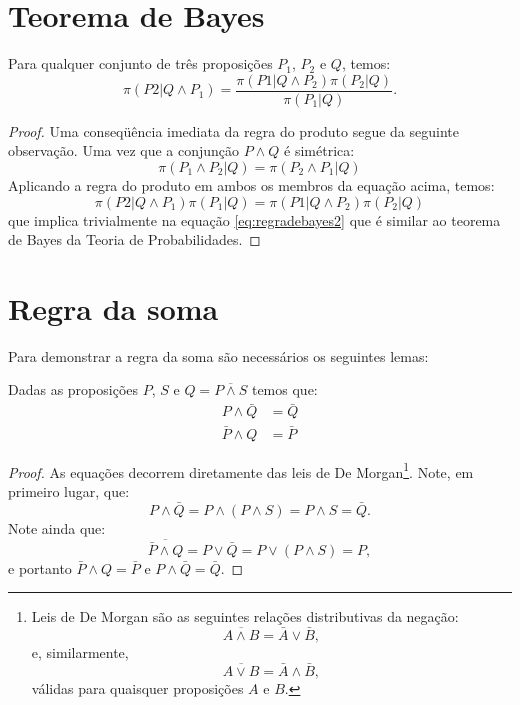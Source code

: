 \section{Teorema de Bayes}
\begin{Teorema}
Para qualquer conjunto de três proposições $P_1$, $P_2$ e $Q$, temos:
\begin{equation}
 \label{eq:regradebayes2}
 \pi(P2 | Q \wedge P_1)  = \frac{\pi(P1 | Q \wedge P_2) \pi(P_2| Q)}{\pi(P_1| Q)}.
\end{equation}
\begin{proof}

Uma conseqüência imediata da regra do produto segue da seguinte observação. Uma vez que a conjunção $P\wedge Q$ é simétrica:
\[
 \pi(P_1\wedge P_2| Q) = \pi(P_2\wedge P_1 | Q) 
\]
Aplicando a regra do produto em ambos os membros da equação acima, temos:
\[
 \pi(P2 | Q \wedge P_1) \pi(P_1| Q) = \pi(P1 | Q \wedge P_2) \pi(P_2| Q)
\]
que implica trivialmente na equação \eqref{eq:regradebayes2} que é similar ao teorema de Bayes da Teoria de Probabilidades.
\end{proof}
\end{Teorema}

\section{Regra da soma}

Para demonstrar a regra da soma são necessários os seguintes lemas:
\begin{Lema}
\label{lema:demorgan}
Dadas as proposições $P$, $S$ e $Q = \overline{P\wedge S}$ temos que:
\begin{align}
  P\wedge\bar{Q}  & = \bar{Q} \\
  \bar{P}\wedge Q &= \bar{P}
\end{align}

\begin{proof}
As equações decorrem diretamente das leis de De Morgan\footnote{Leis de De Morgan são as seguintes relações distributivas da negação: \[\overline{A\wedge B} =\bar{A}\vee\bar{B},\] e, similarmente, \[\overline{A\vee B} = \bar{A}\wedge\bar{B},\] válidas para quaisquer proposições $A$ e $B$.}. Note, em primeiro lugar, que: 
\[
  P\wedge\bar{Q} = P \wedge (P \wedge S) = P \wedge S = \bar{Q}.
\]
Note ainda que:
\[
 \overline{\bar{P}\wedge Q} = P \vee \bar{Q} = P \vee (P \wedge S) = P,
\]
e portanto $\bar{P}\wedge Q = \bar{P}$ e $P\wedge\bar{Q} = \bar{Q}$.
\end{proof}
\end{Lema}

